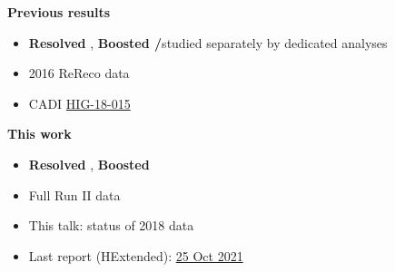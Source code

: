 {  \twoColumns
      {
        \small
        \hspace{1.5cm} \textbf{Previous results}
        \vspace{0.1cm}
        \begin{itemize}
        \item \textcolor{kDarkGreen}{\textbf{Resolved \PQt}},
          \textcolor{kBlue}{\textbf{Boosted \PW/\PQt}}\newline studied separately by dedicated analyses
        \item 2016 ReReco data
        \item CADI \href{https://cms.cern.ch/iCMS/analysisadmin/cadilines?line=HIG-18-015}{\textcolor{kBlue}{HIG-18-015}}
        \end{itemize}
      }
      {
        \small
        \hspace{2cm}  \textbf{This work}
        \vspace{0.1cm}
        \begin{itemize}          
          \item \textcolor{kDarkGreen}{\textbf{Resolved \PQt}}, \textcolor{kBlue}{\textbf{Boosted \PQt}}
          \item Full Run II data
          \item This talk: status of 2018 data
          \item Last report (HExtended):
            \href{https://indico.cern.ch/event/1071752/contributions/4578521/attachments/2333742/3977531/HiggsExtended_MKolosova_25Oct2021.pdf}{\textcolor{kBlue}{25
            Oct 2021}}
        \end{itemize}        
      }
}

